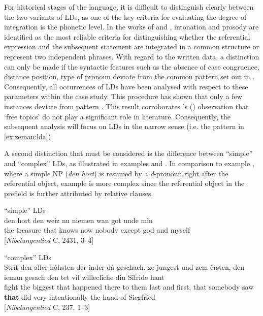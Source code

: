 \documentclass[output=paper,colorlinks,citecolor=brown]{langscibook}
\begin{document}
For historical stages of the language, it is difficult to distinguish clearly between the two variants of LDs, as one of the key criteria for evaluating the degree of integration is the phonetic level. In the works of \citet{Selting1993} and \citet[§ 2015]{Fiehler2009}, intonation and prosody are identified as the most reliable criteria for distinguishing whether the referential expression and the subsequent statement are integrated in a common structure or represent two independent phrases. With regard to the written  data, a distinction can only be made if the syntactic features such as the absence of case congruence, distance position, type of pronoun deviate from the common pattern set out in . Consequently, all occurrences of LDs have been analysed with respect to these parameters within the case study. This procedure has shown that only a few instances deviate from pattern . This result corroborates \citeauthor{Lötscher1994}'s (\citeyear{Lötscher1994}) observation that ‘free topics' do not play a significant role in  literature. Consequently, the subsequent analysis will focus on LDs in the narrow sense (i.e. the pattern in \ref{ex:zeman:lda}).

A second distinction that must be considered is the difference between “simple” and “complex” LDs, as illustrated in examples  and . In comparison to example , where a simple NP (\textit{den hort}) is resumed by a \textit{d}-pronoun right after the referential object, example  is more complex since the referential object in the prefield is further attributed by relative clauses.

\ea \label{ex:zeman:3s}
\ea \label{ex:zeman:3a} 
“simple” LDs\\
\gll den hort den weiz nu niemen wan got unde mîn\\
the treasure that knows now nobody except god and myself\\
\glt \hfill [\textit{Nibelungenlied} C, 2431, 3--4]

\ex \label{ex:zeman:3b}
“complex” LDs\\
\gll Strît den {aller hôhsten} der {inder dâ geschach}, {ze jungest und zem êrsten,} den ieman gesach den tet vil willeclîche {diu Sîfride hant}\\
 fight the biggest that {happened there to them} {last and first,} that somebody saw \textbf{that} did very intentionally {the hand of Siegfried}\\
\glt \hfill [\textit{Nibelungenlied} C, 237, 1–3]
\z 
\z
\end{document}
